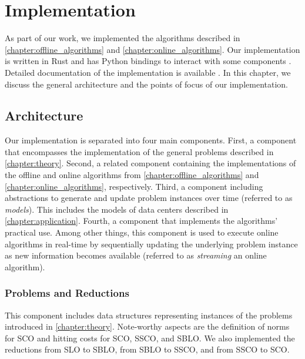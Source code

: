 
\chapter{Implementation}\label{chapter:implementation}

As part of our work, we implemented the algorithms described in \autoref{chapter:offline_algorithms} and \autoref{chapter:online_algorithms}. Our implementation is written in Rust and has Python bindings to interact with some components \cite{Hübotter2021_2, Hübotter2021_3}. Detailed documentation of the implementation is available \cite{Hübotter2021_4}. In this chapter, we discuss the general architecture and the points of focus of our implementation.

\section{Architecture}\label{section:implementation:architecture}

Our implementation is separated into four main components. First, a component that encompasses the implementation of the general problems described in \autoref{chapter:theory}. Second, a related component containing the implementations of the offline and online algorithms from \autoref{chapter:offline_algorithms} and \autoref{chapter:online_algorithms}, respectively. Third, a component including abstractions to generate and update problem instances over time (referred to as \emph{models}). This includes the models of data centers described in \autoref{chapter:application}. Fourth, a component that implements the algorithms' practical use. Among other things, this component is used to execute online algorithms in real-time by sequentially updating the underlying problem instance as new information becomes available (referred to as \emph{streaming} an online algorithm).

\subsection{Problems and Reductions}

This component includes data structures representing instances of the problems introduced in \autoref{chapter:theory}. Note-worthy aspects are the definition of norms for SCO and hitting costs for SCO, SSCO, and SBLO. We also implemented the reductions from SLO to SBLO, from SBLO to SSCO, and from SSCO to SCO.


